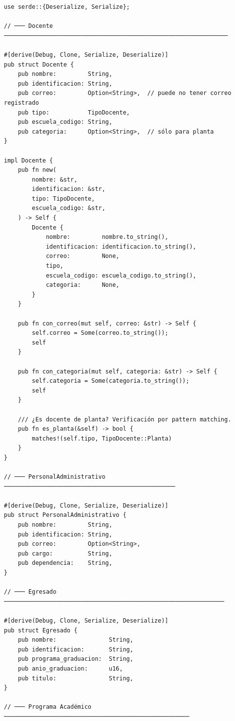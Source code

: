 \begin{lstlisting}[style=rustStyle, caption={Actores del dominio en \rust}, label={lst:rust-actores}]
use serde::{Deserialize, Serialize};

// ─── Docente ────────────────────────────────────────────────────────────────

#[derive(Debug, Clone, Serialize, Deserialize)]
pub struct Docente {
    pub nombre:         String,
    pub identificacion: String,
    pub correo:         Option<String>,  // puede no tener correo registrado
    pub tipo:           TipoDocente,
    pub escuela_codigo: String,
    pub categoria:      Option<String>,  // sólo para planta
}

impl Docente {
    pub fn new(
        nombre: &str,
        identificacion: &str,
        tipo: TipoDocente,
        escuela_codigo: &str,
    ) -> Self {
        Docente {
            nombre:         nombre.to_string(),
            identificacion: identificacion.to_string(),
            correo:         None,
            tipo,
            escuela_codigo: escuela_codigo.to_string(),
            categoria:      None,
        }
    }

    pub fn con_correo(mut self, correo: &str) -> Self {
        self.correo = Some(correo.to_string());
        self
    }

    pub fn con_categoria(mut self, categoria: &str) -> Self {
        self.categoria = Some(categoria.to_string());
        self
    }

    /// ¿Es docente de planta? Verificación por pattern matching.
    pub fn es_planta(&self) -> bool {
        matches!(self.tipo, TipoDocente::Planta)
    }
}

// ─── PersonalAdministrativo ─────────────────────────────────────────────────

#[derive(Debug, Clone, Serialize, Deserialize)]
pub struct PersonalAdministrativo {
    pub nombre:         String,
    pub identificacion: String,
    pub correo:         Option<String>,
    pub cargo:          String,
    pub dependencia:    String,
}

// ─── Egresado ───────────────────────────────────────────────────────────────

#[derive(Debug, Clone, Serialize, Deserialize)]
pub struct Egresado {
    pub nombre:               String,
    pub identificacion:       String,
    pub programa_graduacion:  String,
    pub anio_graduacion:      u16,
    pub titulo:               String,
}

// ─── Programa Académico ─────────────────────────────────────────────────────


\end{lstlisting}
